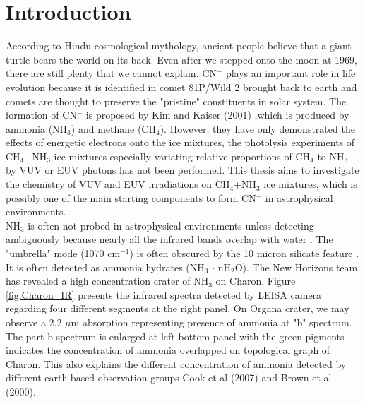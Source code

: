 \chapter{\protect Introduction}
\label{introduction}

According to Hindu cosmological mythology, ancient people believe that a giant turtle bears the world on its back. Even after we stepped onto the moon at 1969, there are still plenty that we cannot explain. CN$^-$ plays an important role in life evolution because it is identified in comet 81P/Wild 2 brought back to earth and comets are thought to preserve the "pristine" constituents in solar system\cite{kissel2004cometary}. The formation of CN$^-$ is proposed by Kim and Kaiser (2001) \cite{kim},which is produced by ammonia (NH$_3$) and methane (CH$_4$). However, they have only demonstrated the effects of energetic electrons onto the ice mixtures, the photolysis experiments of CH$_4$+NH$_3$ ice mixtures especially variating relative proportions of CH$_4$ to NH$_3$ by VUV or EUV photons has not been performed. This thesis aims to investigate the chemistry of VUV and EUV irradiations on CH$_4$+NH$_3$ ice mixtures, which is possibly one of the main starting components to form CN$^-$ in astrophysical environments.\\

NH$_3$ is often not probed in astrophysical environments unless detecting ambiguously because nearly all the infrared bands overlap with water \cite{d1986time}. The "umbrella" mode (1070 cm$^{-1}$) is often obscured by the 10 micron silicate feature \cite{d1986time}. It is often detected as ammonia hydrates (NH$_3$ $\cdot$ nH$_2$O)\cite{cook2007near}. The New Horizons team has revealed a high concentration crater of NH$_3$ on Charon\cite{grundy2016surface}. Figure \ref{fig:Charon_IR} presents the infrared spectra detected by LEISA camera regarding four different segments at the right panel. On Organa crater, we may observe a 2.2 $\mu$m absorption representing presence of ammonia at "b" spectrum. The part b spectrum is enlarged at left bottom panel with the green pigments indicates the concentration of ammonia overlapped on topological graph of Charon. This also explains the different concentration of ammonia detected by different earth-based observation groups Cook et al (2007)\cite{cook2007near} and Brown et al. (2000)\cite{brown2000evidence}.\\

